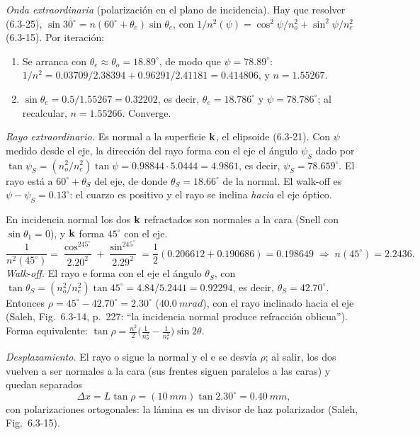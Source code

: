 \emph{Onda extraordinaria} (polarización en el plano de incidencia). Hay que resolver (6.3-25),
$\sin30^\circ=n(60^\circ+\theta_e)\sin\theta_e$, con
$1/n^2(\psi)=\cos^2\psi/n_o^2+\sin^2\psi/n_e^2$ (6.3-15). Por iteración:
\begin{enumerate}
\item Se arranca con $\theta_e\approx\theta_o=18.89^\circ$, de modo que $\psi=78.89^\circ$:
$1/n^2=0.03709/2.38394+0.96291/2.41181=0.414806$, y $n=1.55267$.
\item $\sin\theta_e=0.5/1.55267=0.32202$, es decir, $\theta_e=18.786^\circ$ y $\psi=78.786^\circ$; al recalcular,
$n=1.55266$. Converge.
\end{enumerate}
\emph{Rayo extraordinario.} Es normal a la superficie $\mathbf k$, el elipsoide (6.3-21). Con $\psi$ medido
desde el eje, la dirección del rayo forma con el eje el ángulo $\psi_S$ dado por
$\tan\psi_S=(n_o^2/n_e^2)\tan\psi=0.98844\cdot5.0444=4.9861$, es decir, $\psi_S=78.659^\circ$. El rayo
está a $60^\circ+\theta_S$ del eje, de donde $\theta_S=18.66^\circ$ de la normal. El walk-off es
$\psi-\psi_S=0.13^\circ$: el cuarzo es positivo y el rayo se inclina \emph{hacia} el eje óptico.

 En incidencia normal los dos $\mathbf k$ refractados son normales a la cara (Snell con
$\sin\theta_1=0$), y $\mathbf k$ forma $45^\circ$ con el eje.
\[
\frac{1}{n^2(45^\circ)}=\frac{\cos^245^\circ}{2.20^2}+\frac{\sin^245^\circ}{2.29^2}=\frac12(0.206612+0.190686)=0.198649
\;\Rightarrow\;n(45^\circ)=2.2436 .
\]
\emph{Walk-off.} El rayo e forma con el eje el ángulo $\theta_S$, con
$\tan\theta_S=(n_o^2/n_e^2)\tan45^\circ=4.84/5.2441=0.92294$, es decir, $\theta_S=42.70^\circ$. Entonces
$\rho=45^\circ-42.70^\circ=2.30^\circ$ ($\SI{40.0}{mrad}$), con el rayo inclinado hacia el eje (Saleh, Fig.~6.3-14,
p.~227: ``la incidencia normal produce refracción oblicua''). Forma equivalente:
$\tan\rho=\frac{n^2}{2}\big(\frac{1}{n_o^2}-\frac{1}{n_e^2}\big)\sin2\theta$.

\emph{Desplazamiento.} El rayo o sigue la normal y el e se desvía $\rho$; al salir, los dos vuelven a
ser normales a la cara (sus frentes siguen paralelos a las caras) y quedan separados
\[
\Delta x=L\tan\rho=(\SI{10}{mm})\tan2.30^\circ=\SI{0.40}{mm},
\]
con polarizaciones ortogonales: la lámina es un divisor de haz polarizador (Saleh, Fig.~6.3-15).

